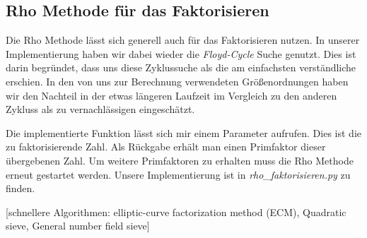 \documentclass{scrartcl}
\begin{document}
\subsection{Rho Methode für das Faktorisieren}
\label{sec:rho_faktorisieren}
Die Rho Methode lässt sich generell auch für das Faktorisieren nutzen.
In unserer Implementierung haben wir dabei wieder die \emph{Floyd-Cycle} Suche genutzt.
Dies ist darin begründet, dass uns diese Zyklussuche als die am einfachsten
verständliche erschien.
In den von uns zur Berechnung verwendeten Größenordnungen haben wir den Nachteil in der
etwas längeren Laufzeit im Vergleich zu den anderen Zykluss als zu vernachlässigen
eingeschätzt.

Die implementierte Funktion lässt sich mir einem Parameter aufrufen.
Dies ist die zu faktorisierende Zahl.
Als Rückgabe erhält man einen Primfaktor dieser übergebenen Zahl.
Um weitere Primfaktoren zu erhalten muss die Rho Methode erneut gestartet werden.
Unsere Implementierung ist in \emph{rho\_faktorisieren.py} zu finden.

[schnellere Algorithmen: elliptic-curve factorization method (ECM), Quadratic sieve, General number field sieve]

\cite{Pollard1975}

\newpage
\printbibliography[heading=bibintoc]
\end{document}
